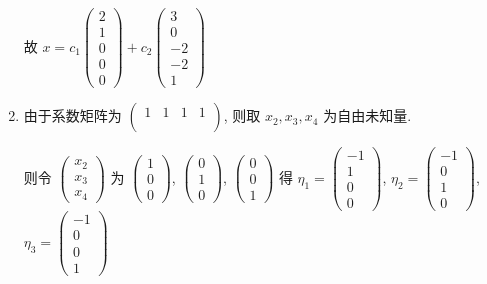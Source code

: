 \begin{enumerate}
			       故 \( x = c_{1}\begin{pmatrix}
				       2 \\
				       1 \\
				       0 \\
				       0 \\
				       0
			       \end{pmatrix} + c_{2}\begin{pmatrix}
				       3  \\
				       0  \\
				       -2 \\
				       -2 \\
				       1
			       \end{pmatrix} \)
			 \item %
			       由于系数矩阵为 \( \begin{pmatrix}
				       1 & 1 & 1 & 1 \\
				         &   &   &   \\
				         &   &   &
			       \end{pmatrix} \), 则取 \( x_{2}, x_{3}, x_{4} \) 为自由未知量.

			       则令 \( \begin{pmatrix}
				       x_{2} \\
				       x_{3} \\
				       x_{4}
			       \end{pmatrix} \) 为 \( \begin{pmatrix}
				       1 \\
				       0 \\
				       0
			       \end{pmatrix} \), \( \begin{pmatrix}
				       0 \\
				       1 \\
				       0
			       \end{pmatrix} \), \( \begin{pmatrix}
				       0 \\
				       0 \\
				       1
			       \end{pmatrix} \) 得 \( \eta_{1} = \begin{pmatrix}
				       -1 \\
				       1  \\
				       0  \\
				       0
			       \end{pmatrix} \), \( \eta_{2} = \begin{pmatrix}
				       -1 \\
				       0  \\
				       1  \\
				       0
			       \end{pmatrix} \), \( \eta_{3} = \begin{pmatrix}
				       -1 \\
				       0  \\
				       0  \\
				       1
			       \end{pmatrix} \)


\end{enumerate}
